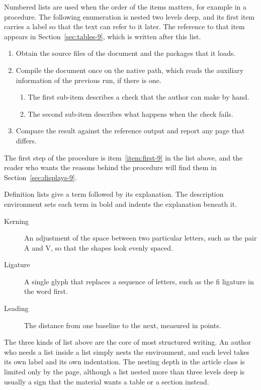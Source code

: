 \documentclass{article}
\begin{document}
Numbered lists are used when the order of the items matters, for example in a
procedure. The following enumeration is nested two levels deep, and its first item
carries a label so that the text can refer to it later. The reference to that item
appears in Section~\ref{sec:tables-9}, which is written after this list.

\begin{enumerate}
  \item\label{item:first-9} Obtain the source files of the document and the packages that
        it loads.
  \item Compile the document once on the native path, which reads the auxiliary
        information of the previous run, if there is one.
        \begin{enumerate}
          \item The first sub-item describes a check that the author can make by hand.
          \item The second sub-item describes what happens when the check fails.
        \end{enumerate}
  \item Compare the result against the reference output and report any page that
        differs.
\end{enumerate}

The first step of the procedure is item~\ref{item:first-9} in the list above, and the
reader who wants the reasons behind the procedure will find them in
Section~\ref{sec:displays-9}.

Definition lists give a term followed by its explanation. The description environment
sets each term in bold and indents the explanation beneath it.

\begin{description}
  \item[Kerning] An adjustment of the space between two particular letters, such as
        the pair A and V, so that the shapes look evenly spaced.
  \item[Ligature] A single glyph that replaces a sequence of letters, such as the
        fi ligature in the word first.
  \item[Leading] The distance from one baseline to the next, measured in points.
\end{description}

The three kinds of list above are the core of most structured writing. An author who
needs a list inside a list simply nests the environment, and each level takes its own
label and its own indentation. The nesting depth in the article class is limited only
by the page, although a list nested more than three levels deep is usually a sign that
the material wants a table or a section instead.
\end{document}
